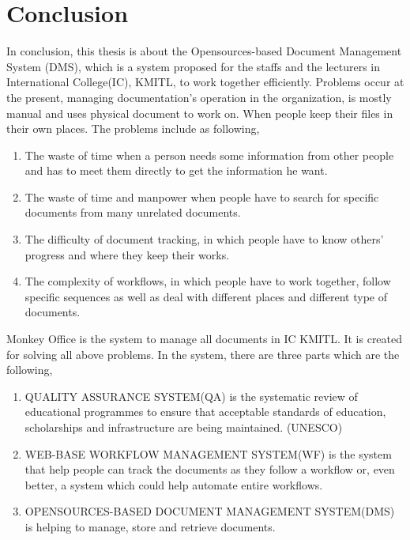 \chapter{Conclusion}

In conclusion, this thesis is about the Opensources-based Document Management System (DMS), which is a system proposed for the staffs and the lecturers in International College(IC), KMITL, to work together efficiently. Problems occur at the present, managing documentation's operation in the organization, is mostly manual and uses physical document to work on. When people keep their files in their own places. The problems include as following,
\begin{enumerate}
\item The waste of time when a person needs some information from other people and has to meet them directly to get the information he want.
\item The waste of time and manpower when people have to search for specific documents from many unrelated documents.
\item The difficulty of document tracking, in which people have to know others' progress and where they keep their works.
\item The complexity of workflows, in which people have to work together, follow specific sequences as well as deal with different places and different type of documents.
\end{enumerate} 


Monkey Office is the system to manage all documents in IC KMITL. It is created for solving all above problems. In the system, there are three parts which are the following,
\begin{enumerate}
	\item QUALITY ASSURANCE SYSTEM(QA) is the systematic review of educational programmes to ensure that acceptable standards of education, scholarships and infrastructure are being maintained. (UNESCO) %

	\item WEB-BASE WORKFLOW MANAGEMENT SYSTEM(WF) is the system that help people can track the documents as they follow a workflow or, even better, a system which could help automate entire workflows. 

	\item OPENSOURCES-BASED DOCUMENT MANAGEMENT SYSTEM(DMS) is helping to manage, store and retrieve documents. 
\end{enumerate}

